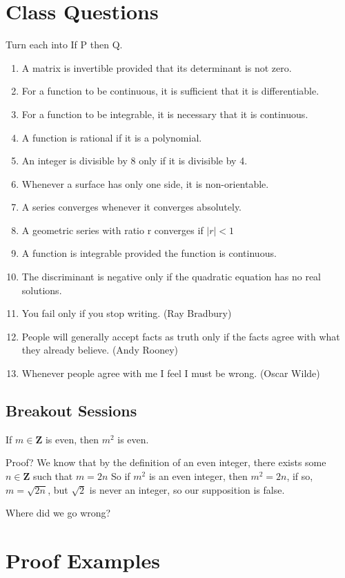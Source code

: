 \documentclass[12pt]{article}
\begin{document}
\section{Class Questions}
Turn each into If P then Q.
\begin{enumerate}
\item A matrix is invertible provided that its determinant is not zero.
\item For a function to be continuous, it is sufficient that it is differentiable.
\item For a function to be integrable, it is necessary that it is continuous.
\item A function is rational if it is a polynomial.
\item An integer is divisible by 8 only if it is divisible by 4.
\item Whenever a surface has only one side, it is non-orientable.
\item A series converges whenever it converges absolutely.
\item A geometric series with ratio r converges if $|r|<1$
\item A function is integrable provided the function is continuous.
\item The discriminant is negative only if the quadratic equation has no real solutions.
\item You fail only if you stop writing. (Ray Bradbury)
\item People will generally accept facts as truth only if the facts agree with what
they already believe. (Andy Rooney)
\item Whenever people agree with me I feel I must be wrong. (Oscar Wilde)
\end{enumerate}
\subsection{Breakout Sessions}

If $m\in \mathbf{Z}$ is even, then $m^2$ is even.

Proof? We know that by the definition of an even integer, there exists some $n\in\mathbf{Z}$ such that $m=2n$
So if $m^2$ is an even integer, then $m^2=2n$, if so, $m=\sqrt{2n}$, but $\sqrt{2}$ is never an integer, so our supposition is false.  

Where did we go wrong?



\pagebreak
\section{Proof Examples}
\end{document}
